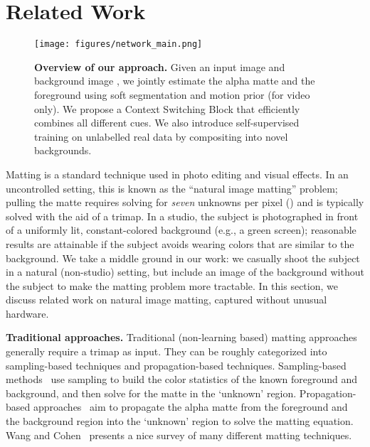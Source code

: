 \documentclass[10pt,twocolumn,letterpaper]{article}
\begin{document}
 \vspace{-0.5em}
\section{Related Work}
\label{sec:related}

\begin{figure*}[!ht]
	\centering
	\texttt{[image: figures/network\_main.png]}    \vspace{-.2cm}
	\caption{\small \textbf{Overview of our approach.} Given an input image  and background image , we jointly estimate the alpha matte  and the foreground  using soft segmentation  and motion prior  (for video only). We propose a Context Switching Block that efficiently combines all different cues. We also introduce self-supervised training on unlabelled real data by compositing into novel backgrounds.}
	\vspace{-1em}
	\label{fig:networks_main}
\end{figure*}

Matting is a standard technique used in photo editing and visual effects. In an uncontrolled setting, this is known as the ``natural image matting'' problem; pulling the matte requires solving for {\em seven} unknowns per pixel () and is typically solved with the aid of a trimap.  In a studio, the subject is photographed in front of a uniformly lit, constant-colored background (e.g., a green screen); reasonable results are attainable if the subject avoids wearing colors that are similar to the background.  We take a middle ground in our work: we casually shoot the subject in a natural (non-studio) setting, but include an image of the background without the subject to make the matting problem more tractable.  In this section, we discuss related work on natural image matting, captured without unusual hardware.



\textbf{Traditional approaches.} Traditional (non-learning based) matting approaches generally require a trimap as input.  They can be roughly categorized into sampling-based techniques and propagation-based techniques. Sampling-based methods~\cite{gastal2010shared,chuang2001bayesian,he2011global,shahrian2013improving,wang2005iterative,wang2007optimized,aksoy2017designing} use sampling to build the color statistics of the known foreground and background, and then solve for the matte in the `unknown' region. Propagation-based approaches~\cite{chen2013knn,lee2011nonlocal,levin2007closed,levin2008spectral,sun2004poisson,grady2005random,he2010fast} aim to propagate the alpha matte from the foreground and the background region into the `unknown' region to solve the matting equation. Wang and Cohen~\cite{wang2008image} presents a nice survey of many different matting techniques.
\end{document}

